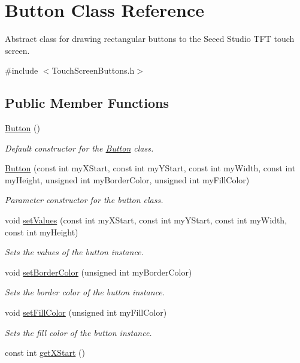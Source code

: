 \hypertarget{class_button}{\section{Button Class Reference}
\label{class_button}
}


Abstract class for drawing rectangular buttons to the Seeed Studio T\+F\+T touch screen.  




{\ttfamily \#include $<$Touch\+Screen\+Buttons.\+h$>$}

\subsection*{Public Member Functions}
\begin{DoxyCompactItemize}
\item 
\hypertarget{class_button_a3b36df1ae23c58aedb9e15a713159459}{\hyperlink{class_button_a3b36df1ae23c58aedb9e15a713159459}{Button} ()}\label{class_button_a3b36df1ae23c58aedb9e15a713159459}

\begin{DoxyCompactList}\small\item\em Default constructor for the \hyperlink{class_button}{Button} class. \end{DoxyCompactList}\item 
\hyperlink{class_button_a05d9eb876fbf996d19ccd50701d520d6}{Button} (const int my\+X\+Start, const int my\+Y\+Start, const int my\+Width, const int my\+Height, unsigned int my\+Border\+Color, unsigned int my\+Fill\+Color)
\begin{DoxyCompactList}\small\item\em Parameter constructor for the button class. \end{DoxyCompactList}\item 
void \hyperlink{class_button_a60111eec4fe5e1c3c71b8b183fa76fdb}{set\+Values} (const int my\+X\+Start, const int my\+Y\+Start, const int my\+Width, const int my\+Height)
\begin{DoxyCompactList}\small\item\em Sets the values of the button instance. \end{DoxyCompactList}\item 
void \hyperlink{class_button_a915d85f07149cce21cc8b61f8b8a4496}{set\+Border\+Color} (unsigned int my\+Border\+Color)
\begin{DoxyCompactList}\small\item\em Sets the border color of the button instance. \end{DoxyCompactList}\item 
void \hyperlink{class_button_a66a48aee66e78d135c3333d6364d1643}{set\+Fill\+Color} (unsigned int my\+Fill\+Color)
\begin{DoxyCompactList}\small\item\em Sets the fill color of the button instance. \end{DoxyCompactList}\item 
\hypertarget{class_button_a10a7f30eaf80e1ea4b0f22491e12ca70}{const int \hyperlink{class_button_a10a7f30eaf80e1ea4b0f22491e12ca70}{get\+X\+Start} ()}\label{class_button_a10a7f30eaf80e1ea4b0f22491e12ca70}


\end{DoxyCompactItemize}
